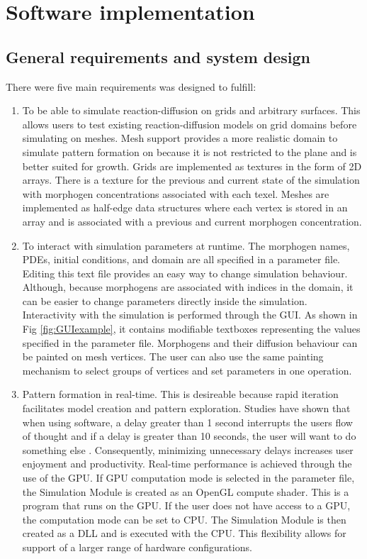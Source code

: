 \chapter{Software implementation}

\section{General requirements and system design}
There were five main requirements \ProgramName{} was designed to fulfill:

\begin{enumerate}
	\item To be able to simulate reaction-diffusion on grids and arbitrary surfaces. This allows users to test existing reaction-diffusion models on grid domains before simulating on meshes. Mesh support provides a more realistic domain to simulate pattern formation on because it is not restricted to the plane and is better suited for growth. Grids are implemented as textures in the form of 2D arrays. There is a texture for the previous and current state of the simulation with morphogen concentrations associated with each texel. Meshes are implemented as half-edge data structures \citep{Mantyla1988} where each vertex is stored in an array and is associated with a previous and current morphogen concentration. 
	
	\item To interact with simulation parameters at runtime. The morphogen names, PDEs, initial conditions, and domain are all specified in a parameter file. Editing this text file provides an easy way to change simulation behaviour. Although, because morphogens are associated with indices in the domain, it can be easier to change parameters directly inside the simulation. Interactivity with the simulation is performed through the GUI. As shown in Fig \ref{fig:GUIexample}, it contains modifiable textboxes representing the values specified in the parameter file. Morphogens and their diffusion behaviour can be painted on mesh vertices. The user can also use the same painting mechanism to select groups of vertices and set parameters in one operation. 

	\item Pattern formation in real-time. This is desireable because rapid iteration facilitates model creation and pattern exploration. Studies have shown that when using software, a delay greater than 1 second interrupts the users flow of thought and if a delay is greater than 10 seconds, the user will want to do something else \citep{nielsen1994usability}. Consequently, minimizing unnecessary delays increases user enjoyment and productivity. Real-time performance is achieved through the use of the GPU. If GPU computation mode is selected in the parameter file, the Simulation Module is created as an OpenGL compute shader. This is a program that runs on the GPU. If the user does not have access to a GPU, the computation mode can be set to CPU. The Simulation Module is then created as a DLL and is executed with the CPU. This flexibility allows for support of a larger range of hardware configurations. 
	

\end{enumerate}
